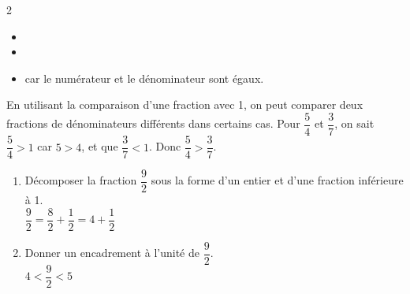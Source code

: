\begin{Exemples}
\vspace{-0.5cm}
\begin{multicols}{2}
\begin{itemize}[label=\textcolor{Couleur8}{$\bullet$}]
\item {}

\item {}
\end{itemize}
\end{multicols}
\begin{itemize}[label=\textcolor{Couleur8}{$\bullet$}]
\item {} car le numérateur et le dénominateur sont égaux.
\end{itemize}
\end{Exemples}

\begin{Exemple}
En utilisant la comparaison d'une fraction avec 1, on peut comparer deux fractions de dénominateurs différents dans certains cas. Pour $\dfrac{5}{4}$ et $\dfrac{3}{7}$, on sait $\dfrac{5}{4} > 1$ car $5 > 4$, et que $\dfrac{3}{7} < 1$. Donc $\dfrac{5}{4} > \dfrac{3}{7}$.
\end{Exemple}


\begin{Exemples}
\begin{enumerate}
\item Décomposer la fraction $\dfrac{9}{2}$ sous la forme d'un entier et d'une fraction inférieure à 1. \\
$\dfrac{9}{2} = \dfrac{8}{2}+\dfrac{1}{2}=4+\dfrac{1}{2}$
\item Donner un encadrement à l'unité de $\dfrac{9}{2}$.\\
$4<\dfrac{9}{2}<5$
\end{enumerate}
\end{Exemples}
